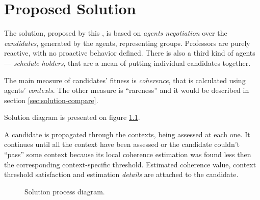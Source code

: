 \documentclass[ThesisDoc]{subfiles}
\providecommand{\rootdir}{.}
\begin{document}
\chapter{Proposed Solution}
\label{chapter:solution}


The solution, proposed by this \thisdoc, is based on \emph{agents negotiation}
over the \emph{candidates}, generated by the agents, representing groups.
Professors are purely reactive, with no proactive behavior defined.
There is also a third kind of agents --- \emph{schedule holders}, that are
a mean of putting individual candidates together.

The main measure of candidates' fitness is \emph{coherence}, that is calculated
using agents' \emph{contexts}. The other measure is ``rareness'' and it would be
described in section \ref{sec:solution-compare}.

Solution diagram is presented on figure \ref{fig:solution-flow}.







\medskip{}\medskip

\noindent
A candidate is propagated through the contexts, being assessed at each one.
It continues until all the context have been assessed or the candidate couldn't
``pass'' some context because its local coherence estimation was found less then
the corresponding context-specific threshold. Estimated coherence value,
context threshold satisfaction and estimation \emph{details}
are attached to the candidate.








\begin{figure}[h]
    \centering
    \resizebox{0.7\textwidth}{!}{
      
      }
  \caption{Solution process diagram.}
  \label{fig:solution-flow}
\end{figure}
\end{document}
